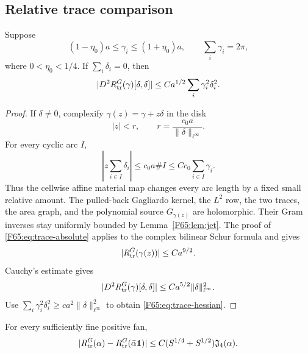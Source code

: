 \subsection{Relative trace comparison}

\begin{proposition}\label{F65:prop:trace-hessian}
Suppose
\begin{equation}\label{F65:eq:quasiuniform}
 (1-\eta_0)a\le\gamma_i\le(1+\eta_0)a,
 \qquad \sum_i\gamma_i=2\pi,
\end{equation}
where $0<\eta_0<1/4$.  If $\sum_i\delta_i=0$, then
\begin{equation}\label{F65:eq:trace-hessian}
 |D^2R_{\rm tr}^G(\gamma)[\delta,\delta]|
 \le Ca^{1/2}\sum_i\gamma_i^2\delta_i^2.
\end{equation}
\end{proposition}

\begin{proof}
If $\delta\ne0$, complexify
$\gamma(z)=\gamma+z\delta$ in the disk
\begin{equation}
 |z|<r,\qquad r=\frac{c_0a}{\|\delta\|_{\ell^\infty}}.
\end{equation}
For every cyclic arc $I$,
\begin{equation}
 \left|z\sum_{i\in I}\delta_i\right|
 \le c_0a\#I
 \le Cc_0\sum_{i\in I}\gamma_i.
\end{equation}
Thus the cellwise affine material map changes every arc length by a fixed
small relative amount.  The pulled-back Gagliardo kernel, the $L^2$ row,
the two traces, the area graph, and the polynomial source $G_{\gamma(z)}$
are holomorphic.  Their Gram inverses stay uniformly bounded by
Lemma~\ref{F65:lem:jet}.  The proof of \eqref{F65:eq:trace-absolute} applies to the
complex bilinear Schur formula and gives
\begin{equation}
 |R_{\rm tr}^G(\gamma(z))|\le Ca^{9/2}.
\end{equation}
Cauchy's estimate gives
\begin{equation}
 |D^2R_{\rm tr}^G(\gamma)[\delta,\delta]|
 \le Ca^{5/2}\|\delta\|_{\ell^\infty}^2.
\end{equation}
Use
$\sum_i\gamma_i^2\delta_i^2\ge c a^2
\|\delta\|_{\ell^\infty}^2$ to obtain \eqref{F65:eq:trace-hessian}.
\end{proof}

\begin{lemma}\label{F65:lem:trace-relative}
For every sufficiently fine positive fan,
\begin{equation}\label{F65:eq:trace-relative}
 |R_{\rm tr}^G(\alpha)-R_{\rm tr}^G(\bar\alpha\mathbf1)|
 \le C(S^{1/4}+S^{1/2})\mathfrak J_4(\alpha).
\end{equation}
\end{lemma}


